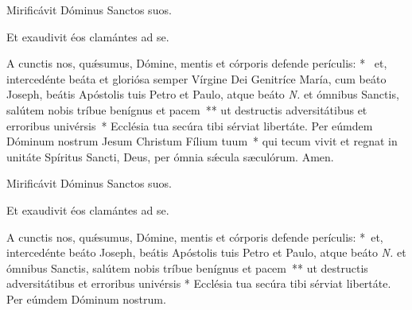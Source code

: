 \vv Mirificávit Dóminus Sanctos suos.

\rr Et exaudivit éos clamántes ad se.

\oratio

\lettrine{A}{} cun\-ctis nos, quǽsumus, Dómine, mentis et córporis defende perículis: \nolinebreak[4]*~ et, intercedénte beáta et gloriósa semper Vírgine Dei Genitríce María, cum beáto Joseph, beátis Apóstolis tuis Petro et Paulo, atque beáto \textit{N.} et ómnibus Sanctis, salútem nobis tríbue benígnus et pacem~** ut destructis adversitátibus et erroribus univérsis~* Ecclésia tua secúra tibi sérviat libertáte. Per eúmdem Dóminum nostrum Jesum Christum Fílium tuum~* qui tecum vivit et regnat in unitáte Spíritus Sancti, Deus, per ómnia sǽcula sæculórum. \rr Amen.



\vv Mirificávit Dóminus Sanctos suos.

\rr Et exaudivit éos clamántes ad se.

\oratio

\lettrine{A}{} cun\-ctis nos, quǽsumus, Dómine, mentis et córporis defende perículis: \nolinebreak[4]*~et, intercedénte beáto Joseph, beátis Apóstolis tuis Petro et Paulo, atque beáto \textit{N.} et ómnibus Sanctis, salútem nobis tríbue benígnus et pacem~** ut destructis adversitátibus et erroribus univérsis * Ecclésia tua secúra tibi sérviat libertáte. Per eúmdem Dóminum nostrum.